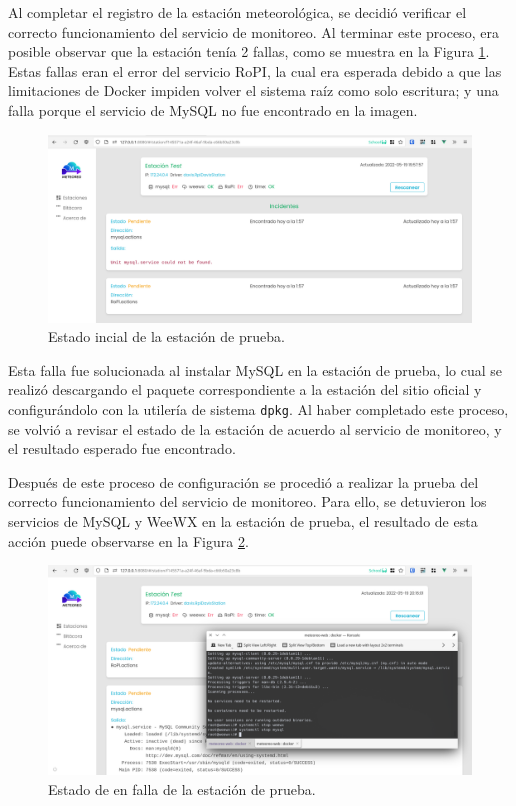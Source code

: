 Al completar el registro de la estación meteorológica, se decidió verificar el correcto funcionamiento del servicio de monitoreo. Al terminar este proceso, era posible observar que la estación tenía 2 fallas, como se muestra en la Figura \ref{fig:test-station-initial}. Estas fallas eran el error del servicio RoPI, la cual era esperada debido a que las limitaciones de Docker impiden volver el sistema raíz como solo escritura; y una falla porque el servicio de MySQL no fue encontrado en la imagen.

\begin{figure}[!ht]
	\centering
	\includegraphics[width=1\linewidth]{images/screenshots/0.1.2-test_station_initial_status.png}
	\caption{Estado incial de la estación de prueba.}
	\label{fig:test-station-initial}
\end{figure}

Esta falla fue solucionada al instalar MySQL en la estación de prueba, lo cual se realizó descargando el paquete correspondiente a la estación del sitio oficial y configurándolo con la utilería de sistema \texttt{dpkg}. Al haber completado este proceso, se volvió a revisar el estado de la estación de acuerdo al servicio de monitoreo, y el resultado esperado fue encontrado.

Después de este proceso de configuración se procedió a realizar la prueba del correcto funcionamiento del servicio de monitoreo. Para ello, se detuvieron los servicios de MySQL y WeeWX en la estación de prueba, el resultado de esta acción puede observarse en la Figura \ref{fig:test-station-failed}.

\begin{figure}[!ht]
	\centering
	\includegraphics[width=1\linewidth]{images/screenshots/0.1.4-test_station_failed.png}
	\caption{Estado de en falla de la estación de prueba.}
	\label{fig:test-station-failed}
\end{figure}

